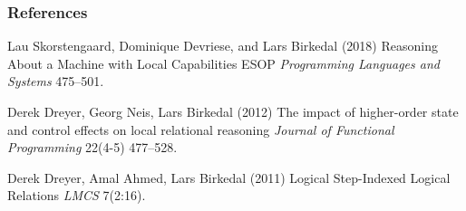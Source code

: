 \documentclass{beamer}
\begin{document}

\begin{frame}
\frametitle{References}
\footnotesize{
\begin{thebibliography}{99} %
 Lau Skorstengaard, 
Dominique Devriese, 
and Lars Birkedal (2018)
\newblock Reasoning About a Machine with Local Capabilities
\newblock ESOP \emph{Programming Languages and Systems} 475--501.

 Derek Dreyer, Georg Neis, Lars Birkedal (2012)
\newblock The impact of higher-order state and control effects on local relational reasoning
\newblock \emph{Journal of Functional Programming} 22(4-5) 477--528.

 Derek Dreyer, Amal Ahmed, Lars Birkedal (2011)
\newblock Logical Step-Indexed Logical Relations
\newblock \emph{LMCS} 7(2:16).

\end{thebibliography}
}
\end{frame}

\end{document}
